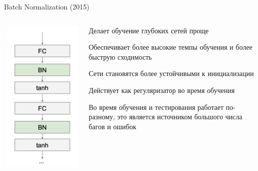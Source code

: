 \documentclass[notes,12pt, aspectratio=169]{beamer}
\newenvironment{wideitemize}{\itemize\addtolength{\itemsep}{10pt}}{\enditemize}
\begin{document}
\begin{frame}{Batch Normalization (2015)}
	\begin{columns}[T] %
		\begin{column}{.3\textwidth}
			\includegraphics[width=.9\linewidth]{batch_norm_in_nn.png}
		\end{column}%
		\hfill%
		\begin{column}{.7\textwidth}
			\begin{wideitemize}
				\item  Делает обучение глубоких сетей проще
				\item Обеспечивает более высокие темпы обучения и более быструю сходимость
				\item Сети становятся более устойчивыми к инициализации
				\item Действует как регуляризатор во время обучения 
				\item \alert{Во время обучения и тестирования работает по-разному, это является источником большого числа багов и ошибок}
			\end{wideitemize}
		\end{column}%
	\end{columns}
\end{frame}
\end{document}
